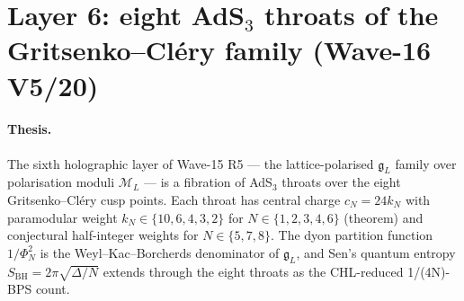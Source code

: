 
\providecommand{\ClaimStatusTheorem}{\textsc{[theorem]}}
\providecommand{\ClaimStatusConjectured}{\textsc{[conjectural]}}
\providecommand{\ClaimStatusHeuristic}{\textsc{[heuristic]}}
\providecommand{\kBKM}{\kappa_{\mathrm{BKM}}}
\providecommand{\kch}{\kappa_{\mathrm{ch}}}
\providecommand{\kcat}{\kappa_{\mathrm{cat}}}
\providecommand{\kfib}{\kappa_{\mathrm{fiber}}}
\providecommand{\gBKM}{\mathfrak{g}_{\Delta_{5}}}
\providecommand{\gL}{\mathfrak{g}_{L}}
\providecommand{\Deltafive}{\Delta_{5}}
\providecommand{\AdS}{\mathrm{AdS}}
\providecommand{\BH}{\mathrm{BH}}
\providecommand{\C}{\mathbb{C}}
\providecommand{\Z}{\mathbb{Z}}
\providecommand{\Q}{\mathbb{Q}}
\providecommand{\cM}{\mathcal{M}}
\providecommand{\cC}{\mathcal{C}}
\providecommand{\cO}{\mathcal{O}}

\section*{Layer 6: eight AdS$_3$ throats of the Gritsenko--Cl\'ery
  family (Wave-16 V5/20)}
\label{sec:wave16-v5-layer6-ads3-throats}

\paragraph{Thesis.}
The sixth holographic layer of Wave-15 R5 --- the lattice-polarised
$\gL$ family over polarisation moduli $\cM_L$ --- is a fibration of
AdS$_3$ throats over the eight Gritsenko--Cl\'ery cusp points. Each
throat has central charge $c_N=24 k_N$ with paramodular weight
$k_N\in\{10,6,4,3,2\}$ for $N\in\{1,2,3,4,6\}$ (theorem) and
conjectural half-integer weights for $N\in\{5,7,8\}$. The dyon
partition function $1/\Phi_N^2$ is the Weyl--Kac--Borcherds
denominator of $\gL$, and Sen's quantum entropy
$S_{\BH}=2\pi\sqrt{\Delta/N}$ extends through the eight throats as
the CHL-reduced 1/(4N)-BPS count.

